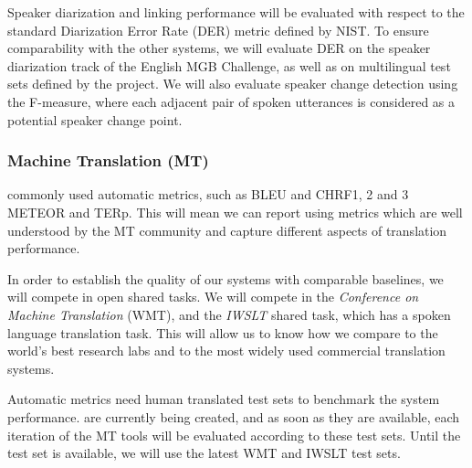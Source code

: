 Speaker diarization and linking performance will be evaluated with respect to the standard Diarization Error Rate (DER) metric defined by NIST.  To ensure comparability with the other systems, we will evaluate DER on the speaker diarization track of the English MGB Challenge, as well as on multilingual test sets defined by the project.  We will also evaluate speaker change detection using the F-measure, where each adjacent pair of spoken utterances is considered as a potential speaker change point.


\subsubsection{Machine Translation (MT)}


commonly used automatic metrics, such as BLEU and CHRF1, 2 and 3  METEOR and TERp. This will mean we can report using metrics which are well understood by the MT community and capture different aspects of translation performance. 

In order to establish the quality of our systems with comparable baselines, we will compete in open shared tasks. We will compete in the  \textit{Conference on Machine Translation} (WMT), and the \textit{IWSLT} shared task, which has a spoken language translation task.  This will allow us to know how we compare to the world's best research labs and to the most widely used commercial translation systems. 

Automatic metrics need human translated test sets to benchmark the system performance.  \SUMMA {} are currently being created, and as soon as they are available, each iteration of the \SUMMA MT tools will be evaluated according to these test sets. Until the \SUMMA test set is available, we will use the latest WMT and IWSLT test sets. 

